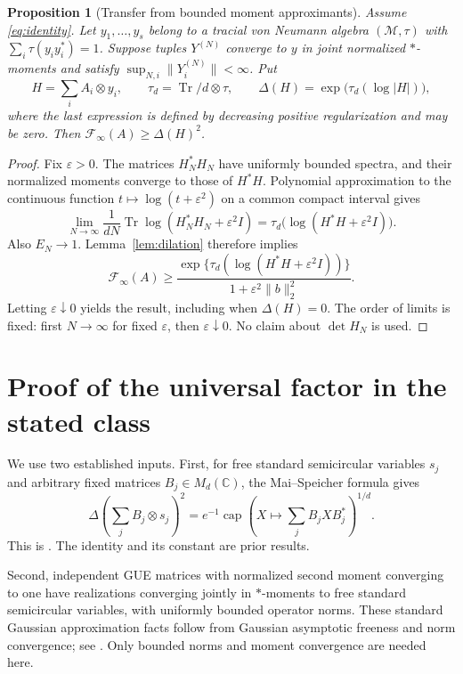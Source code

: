 \documentclass[11pt]{article}
\newtheorem{proposition}[theorem]{Proposition}
\newcommand{\C}{\mathbb C}
\newcommand{\Tr}{\operatorname{Tr}}
\newcommand{\capop}{\operatorname{cap}}
\newcommand{\F}{\mathcal F}
\begin{document}
\begin{proposition}[Transfer from bounded moment approximants]\label{prop:transfer}
Assume \eqref{eq:identity}. Let $y_1,\ldots,y_s$ belong to a tracial von Neumann algebra $(\mathcal M,\tau)$ with $\sum_i\tau(y_iy_i^*)=1$. Suppose tuples $Y^{(N)}$ converge to $y$ in joint normalized $*$-moments and satisfy $\sup_{N,i}\|Y_i^{(N)}\|<\infty$. Put
\[
 H=\sum_i A_i\otimes y_i,\qquad \tau_d=\Tr/d\otimes\tau,\qquad
 \Delta(H)=\exp\bigl(\tau_d(\log|H|)\bigr),
\]
where the last expression is defined by decreasing positive regularization and may be zero. Then $\F_\infty(A)\ge\Delta(H)^2$.
\end{proposition}
\begin{proof}
Fix $\varepsilon>0$. The matrices $H_N^*H_N$ have uniformly bounded spectra, and their normalized moments converge to those of $H^*H$. Polynomial approximation to the continuous function $t\mapsto\log(t+\varepsilon^2)$ on a common compact interval gives
\[
 \lim_{N\to\infty}\frac1{dN}\Tr\log(H_N^*H_N+\varepsilon^2I)
 =\tau_d\bigl(\log(H^*H+\varepsilon^2I)\bigr).
\]
Also $E_N\to1$. Lemma~\ref{lem:dilation} therefore implies
\[
 \F_\infty(A)\ge
 \frac{\exp\{\tau_d(\log(H^*H+\varepsilon^2I))\}}
 {1+\varepsilon^2\|b\|_2^2}.
\]
Letting $\varepsilon\downarrow0$ yields the result, including when $\Delta(H)=0$.
The order of limits is fixed: first $N\to\infty$ for fixed $\varepsilon$, then $\varepsilon\downarrow0$. No claim about $\det H_N$ is used.
\end{proof}

\section{Proof of the universal factor in the stated class}
We use two established inputs. First, for free standard semicircular variables $s_j$ and arbitrary fixed matrices $B_j\in M_d(\C)$, the Mai--Speicher formula gives
\begin{equation}\label{eq:MS}
 \Delta\left(\sum_jB_j\otimes s_j\right)^2
 =e^{-1}\capop\left(X\mapsto\sum_jB_jXB_j^*\right)^{1/d}.
\end{equation}
This is \cite[Theorem 1.2]{ms}. The identity and its constant are prior results.

Second, independent GUE matrices with normalized second moment converging to one have realizations converging jointly in $*$-moments to free standard semicircular variables, with uniformly bounded operator norms. These standard Gaussian approximation facts follow from Gaussian asymptotic freeness and norm convergence; see \cite{v,ht}. Only bounded norms and moment convergence are needed here.
\end{document}
